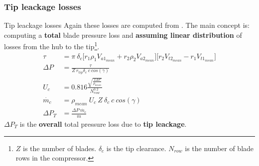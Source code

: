 \subsubsection{Tip leackage losses}
	{\nologo
	\begin{frame}{Tip leackage losses}
		Again these losses are computed from \cite[Sec. 6.9]{axial2004}. The main concept is: computing a \textbf{total} blade pressure loss and \textbf{assuming linear distribution} of losses from the hub to the tip\footnote{$Z$ is the number of blades. $\delta_c$ is the tip clearance. $N_{row}$ is the number of blade rows in the compressor.}. 
		\begin{align}
			\tau & = \pi \ \delta_c \Big[ r_1 \rho_1 V_{a1_{mean}} + r_2 \rho_2 V_{a2_{mean}} \Big] \Big[ r_2 V_{t2_{mean}} - r_1 V_{t1_{mean}} \Big] \nonumber \\ 
			\Delta P & = \frac{\tau}{Z \ r_{tip} \delta_c \ c \ cos(\gamma)} \nonumber \\ 
			U_c & = 0.816 \frac{\sqrt{\frac{2 \Delta P}{\rho_{mean}}}}{N_{row}^{0.2}} \nonumber \\ 
			\dot{m_c} & = \rho_{mean} \ U_c \ Z \ \delta_c \ c \ cos(\gamma) \nonumber \\ 
			\Delta P_T & = \frac{\Delta P \ \dot{m_c}}{\dot{m}} \nonumber  
		\end{align}
		$\Delta P_T$ is the \textbf{overall} total pressure loss due to \textbf{tip leackage}.
		\vspace{0.11cm}
	\end{frame}
	}

